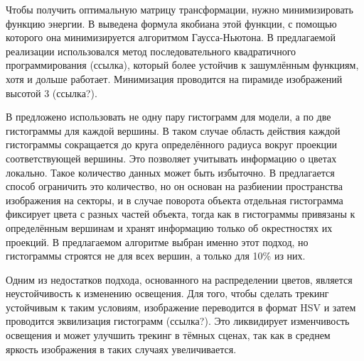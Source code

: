 Чтобы получить оптимальную матрицу трансформации, нужно минимизировать функцию энергии. В \cite{Tjaden2018} выведена формула якобиана этой функции, с помощью которого она минимизируется алгоритмом Гаусса-Ньютона. В предлагаемой реализации использовался метод последовательного квадратичного программирования (ссылка), который более устойчив к зашумлённым функциям, хотя и дольше работает. Минимизация проводится на пирамиде изображений высотой 3 (ссылка?).

В \cite{Tjaden2017} предложено использовать не одну пару гистограмм для модели, а по две гистограммы для каждой вершины. В таком случае область действия каждой гистограммы сокращается до круга определённого радиуса вокруг проекции соответствующей вершины. Это позволяет учитывать информацию о цветах локально. Такое количество данных может быть избыточно. В \cite{RegionPhotometric} предлагается способ ограничить это количество, но он основан на разбиении пространства изображения на секторы, и  в случае поворота объекта отдельная гистограмма фиксирует цвета с разных частей объекта, тогда как в \cite{Tjaden2017} гистограммы привязаны к определённым вершинам и хранят информацию только об окрестностях их проекций. В предлагаемом алгоритме выбран именно этот подход, но гистограммы строятся не для всех вершин, а только для 10\% из них.

Одним из недостатков подхода, основанного на распределении цветов, является неустойчивость к изменению освещения. Для того, чтобы сделать трекинг устойчивым к таким условиям, изображение переводится в формат HSV и затем проводится эквилизация гистограмм (ссылка?). Это ликвидирует изменчивость освещения и может улучшить трекинг в тёмных сценах, так как в среднем яркость изображения в таких случаях увеличивается.